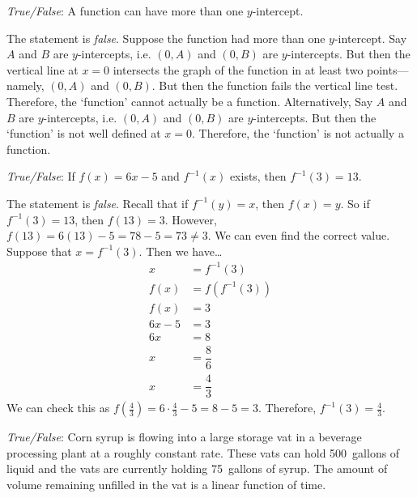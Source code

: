 \documentclass[11pt,letterpaper]{article}
\begin{document}
\quizsol \textit{True/False}: A function can have more than one $y$-intercept. \pspace

\sol The statement is \textit{false}. Suppose the function had more than one $y$-intercept. Say $A$ and $B$ are $y$-intercepts, i.e. $(0, A)$ and $(0, B)$ are $y$-intercepts. But then the vertical line at $x= 0$ intersects the graph of the function in at least two points---namely, $(0, A)$ and $(0, B)$. But then the function fails the vertical line test. Therefore, the `function' cannot actually be a function. Alternatively, Say $A$ and $B$ are $y$-intercepts, i.e. $(0, A)$ and $(0, B)$ are $y$-intercepts. But then the `function' is not well defined at $x= 0$. Therefore, the `function' is not actually a function. \pvspace{1.3cm}



\quizsol \textit{True/False}: If $f(x)= 6x - 5$ and $f^{-1}(x)$ exists, then $f^{-1}(3)= 13$. \pspace

\sol The statement is \textit{false}. Recall that if $f^{-1}(y)= x$, then $f(x)= y$. So if $f^{-1}(3)= 13$, then $f(13)= 3$. However, $f(13)= 6(13) - 5= 78 - 5= 73 \neq 3$. We can even find the correct value. Suppose that $x= f^{-1}(3)$. Then we have\dots
	\[
	\begin{aligned}
	x&= f^{-1}(3) \\
	f(x)&= f(f^{-1}(3)) \\
	f(x)&= 3 \\
	6x - 5&= 3 \\
	6x&= 8 \\
	x&= \dfrac{8}{6} \\
	x&= \dfrac{4}{3}
	\end{aligned}
	\]
We can check this as $f(\frac{4}{3})= 6 \cdot \frac{4}{3} - 5= 8 - 5= 3$. Therefore, $f^{-1}(3)= \frac{4}{3}$. \pvspace{1.5cm}



\quizsol \textit{True/False}: Corn syrup is flowing into a large storage vat in a beverage processing plant at a roughly constant rate. These vats can hold 500~gallons of liquid and the vats are currently holding 75~gallons of syrup. The amount of volume remaining unfilled in the vat is a linear function of time. \pspace
\end{document}
